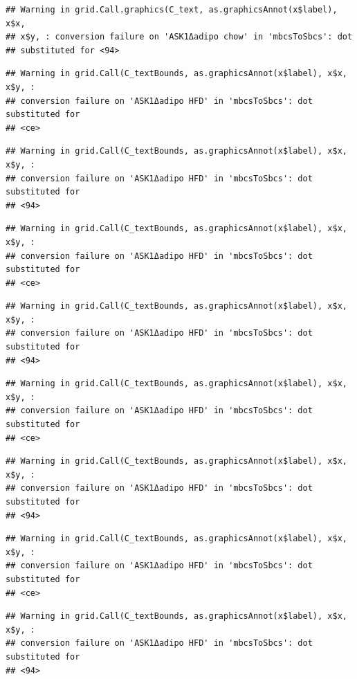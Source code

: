 \documentclass[]{book}
\begin{document}
\begin{verbatim}
## Warning in grid.Call.graphics(C_text, as.graphicsAnnot(x$label), x$x,
## x$y, : conversion failure on 'ASK1Δadipo chow' in 'mbcsToSbcs': dot
## substituted for <94>
\end{verbatim}

\begin{verbatim}
## Warning in grid.Call(C_textBounds, as.graphicsAnnot(x$label), x$x, x$y, :
## conversion failure on 'ASK1Δadipo HFD' in 'mbcsToSbcs': dot substituted for
## <ce>
\end{verbatim}

\begin{verbatim}
## Warning in grid.Call(C_textBounds, as.graphicsAnnot(x$label), x$x, x$y, :
## conversion failure on 'ASK1Δadipo HFD' in 'mbcsToSbcs': dot substituted for
## <94>
\end{verbatim}

\begin{verbatim}
## Warning in grid.Call(C_textBounds, as.graphicsAnnot(x$label), x$x, x$y, :
## conversion failure on 'ASK1Δadipo HFD' in 'mbcsToSbcs': dot substituted for
## <ce>
\end{verbatim}

\begin{verbatim}
## Warning in grid.Call(C_textBounds, as.graphicsAnnot(x$label), x$x, x$y, :
## conversion failure on 'ASK1Δadipo HFD' in 'mbcsToSbcs': dot substituted for
## <94>
\end{verbatim}

\begin{verbatim}
## Warning in grid.Call(C_textBounds, as.graphicsAnnot(x$label), x$x, x$y, :
## conversion failure on 'ASK1Δadipo HFD' in 'mbcsToSbcs': dot substituted for
## <ce>
\end{verbatim}

\begin{verbatim}
## Warning in grid.Call(C_textBounds, as.graphicsAnnot(x$label), x$x, x$y, :
## conversion failure on 'ASK1Δadipo HFD' in 'mbcsToSbcs': dot substituted for
## <94>
\end{verbatim}

\begin{verbatim}
## Warning in grid.Call(C_textBounds, as.graphicsAnnot(x$label), x$x, x$y, :
## conversion failure on 'ASK1Δadipo HFD' in 'mbcsToSbcs': dot substituted for
## <ce>
\end{verbatim}

\begin{verbatim}
## Warning in grid.Call(C_textBounds, as.graphicsAnnot(x$label), x$x, x$y, :
## conversion failure on 'ASK1Δadipo HFD' in 'mbcsToSbcs': dot substituted for
## <94>
\end{verbatim}
\end{document}
